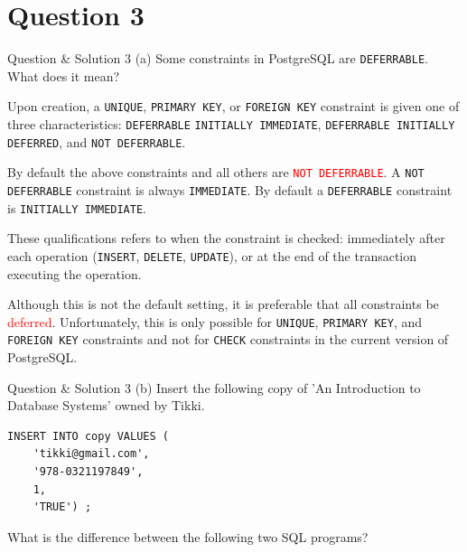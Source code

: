 \section*{Question 3}

\begin{frame}[fragile]{Question \& Solution 3 (a)}
Some constraints in PostgreSQL are \texttt{DEFERRABLE}. What does it mean? \vspace{10pt}

Upon creation, a \texttt{UNIQUE}, \texttt{PRIMARY KEY}, or \texttt{FOREIGN KEY} constraint is given one of three characteristics: \texttt{DEFERRABLE} \texttt{INITIALLY IMMEDIATE}, \texttt{DEFERRABLE INITIALLY DEFERRED}, and \texttt{NOT DEFERRABLE}.  \vspace{10pt}

By default the above constraints and all others are \textcolor{red}{\texttt{NOT DEFERRABLE}}. A \texttt{NOT DEFERRABLE} constraint is always \texttt{IMMEDIATE}. By default a \texttt{DEFERRABLE} constraint is \texttt{INITIALLY IMMEDIATE}. \vspace{10pt}

These qualifications refers to when the constraint is checked: immediately after each operation (\texttt{INSERT}, \texttt{DELETE}, \texttt{UPDATE}), or at the end of the transaction executing the operation. \vspace{10pt}

Although this is not the default setting, it is preferable that all constraints be \textcolor{red}{deferred}. Unfortunately, this is only possible for \texttt{UNIQUE}, \texttt{PRIMARY KEY}, and \texttt{FOREIGN KEY} constraints and not for \texttt{CHECK} constraints in the current version of PostgreSQL.
\end{frame}


\begin{frame}[fragile]{Question \& Solution 3 (b)}
Insert the following copy of 'An Introduction to Database Systems' owned by Tikki. \vspace{10pt}

\begin{lstlisting}
INSERT INTO copy VALUES (
	'tikki@gmail.com', 
	'978-0321197849', 
	1, 
	'TRUE') ;
\end{lstlisting}

What is the difference between the following two SQL programs?
\end{frame}


